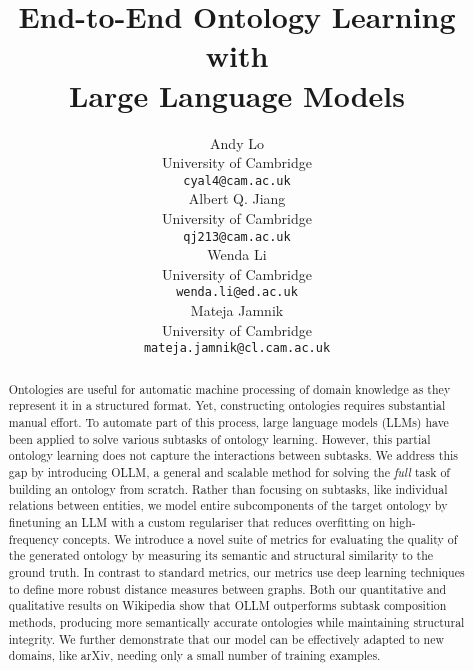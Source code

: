 \documentclass{article}
\title{End-to-End Ontology Learning with \\Large Language Models}
\author{%
    Andy Lo \\
    University of Cambridge\\
    \texttt{cyal4@cam.ac.uk} \\
    Albert Q. Jiang \\
    University of Cambridge\\
    \texttt{qj213@cam.ac.uk} \\
    Wenda Li \\
    University of Cambridge\\
    \texttt{wenda.li@ed.ac.uk} \\
    Mateja Jamnik \\
    University of Cambridge\\
    \texttt{mateja.jamnik@cl.cam.ac.uk} \\
}
\newcommand{\name}{{OLLM}\xspace}
\begin{document}
\maketitle

\begin{abstract}
Ontologies are useful for automatic machine processing of domain knowledge as they represent it in a structured format.
Yet, constructing ontologies requires substantial manual effort. To automate part of this process, large language models (LLMs) have been applied to solve various subtasks of ontology learning. However, this partial ontology learning does not capture the interactions between subtasks. 
We address this gap by introducing \name, a general and scalable method for solving the \emph{full} task of building an ontology from scratch.
Rather than focusing on subtasks, like individual relations between entities, we model entire subcomponents of the target ontology by finetuning an LLM with a custom regulariser that reduces overfitting on high-frequency concepts. We introduce a novel suite of metrics for evaluating the quality of the generated ontology by measuring its semantic and structural similarity to the ground truth. In contrast to standard metrics, our metrics use deep learning techniques to define more robust distance measures between graphs.
Both our quantitative and qualitative results on Wikipedia show that \name outperforms subtask composition methods, producing more semantically accurate ontologies while maintaining structural integrity. We further demonstrate that our model can be effectively adapted to new domains, like arXiv, needing only a small number of training examples.
\end{abstract}


\end{document}
